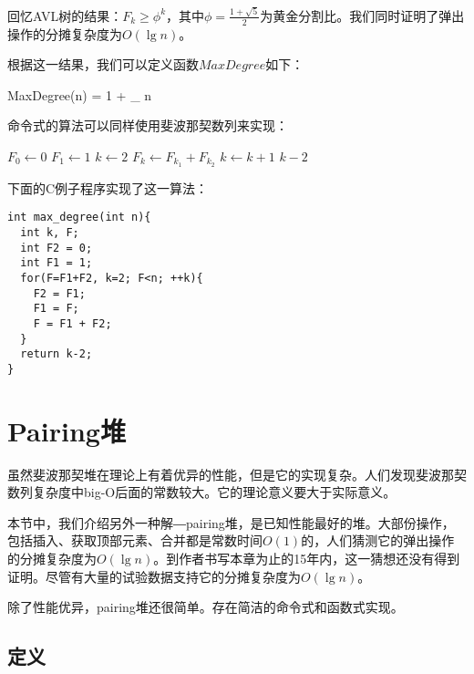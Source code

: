 \documentclass[UTF8]{article}
\begin{document}
回忆AVL树的结果：$F_k \geq \phi^k$，其中$\phi = \frac{1+\sqrt{5}}{2}$为黄金分割比。我们同时证明了弹出操作的分摊复杂度为$O(\lg n)$。

根据这一结果，我们可以定义函数$MaxDegree$如下：

\be
  MaxDegree(n) = 1 + \lfloor \log_{\phi} n \rfloor
\ee

命令式的算法可以同样使用斐波那契数列来实现：

\begin{algorithmic}[1]
  \State $F_0 \gets 0$
  \State $F_1 \gets 1$
  \State $k \gets 2$
  \Repeat
    \State $F_k \gets F_{k_1} + F_{k_2}$
    \State $k \gets k+1$
  \State \Return $k-2$
\EndFunction
\end{algorithmic}

下面的C例子程序实现了这一算法：

\lstset{language=C}
\begin{lstlisting}
int max_degree(int n){
  int k, F;
  int F2 = 0;
  int F1 = 1;
  for(F=F1+F2, k=2; F<n; ++k){
    F2 = F1;
    F1 = F;
    F = F1 + F2;
  }
  return k-2;
}
\end{lstlisting}


\section{Pairing堆}
\label{pairing-heap} 

虽然斐波那契堆在理论上有着优异的性能，但是它的实现复杂。人们发现斐波那契数列复杂度中big-O后面的常数较大。它的理论意义要大于实际意义。

本节中，我们介绍另外一种解―pairing堆，是已知性能最好的堆。大部份操作，包括插入、获取顶部元素、合并都是常数时间$O(1)$的，人们猜测它的弹出操作的分摊复杂度为$O(\lg n)$\cite{pairing-heap}\cite{okasaki-book}。到作者书写本章为止的15年内，这一猜想还没有得到证明。尽管有大量的试验数据支持它的分摊复杂度为$O(\lg n)$。

除了性能优异，pairing堆还很简单。存在简洁的命令式和函数式实现。

\subsection{定义}
\end{document}
